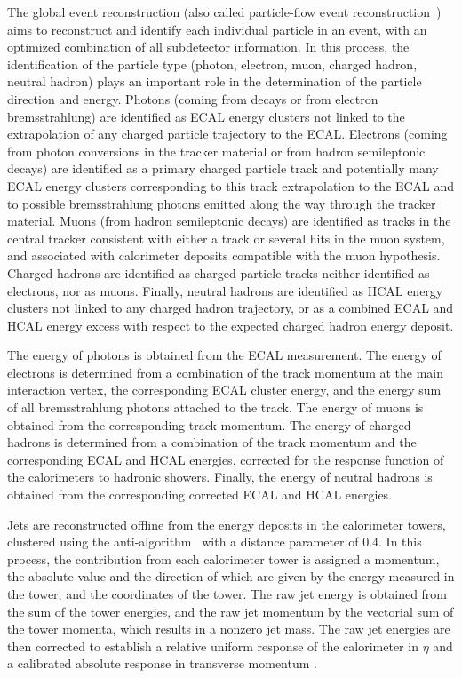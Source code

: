 The global event reconstruction (also called particle-flow event reconstruction~\cite{CMS:2017yfk}) aims to reconstruct and identify each individual particle in an event, with an optimized combination of all subdetector information. In this process, the identification of the particle type (photon, electron, muon, charged hadron, neutral hadron) plays an important role in the determination of the particle direction and energy. Photons (\eg coming from \PGpz decays or from electron bremsstrahlung) are identified as ECAL energy clusters not linked to the extrapolation of any charged particle trajectory to the ECAL. Electrons (\eg coming from photon conversions in the tracker material or from \PB hadron semileptonic decays) are identified as a primary charged particle track and potentially many ECAL energy clusters corresponding to this track extrapolation to the ECAL and to possible bremsstrahlung photons emitted along the way through the tracker material. Muons (\eg from \PB hadron semileptonic decays) are identified as tracks in the central tracker consistent with either a track or several hits in the muon system, and associated with calorimeter deposits compatible with the muon hypothesis. Charged hadrons are identified as charged particle tracks neither identified as electrons, nor as muons. Finally, neutral hadrons are identified as HCAL energy clusters not linked to any charged hadron trajectory, or as a combined ECAL and HCAL energy excess with respect to the expected charged hadron energy deposit.

The energy of photons is obtained from the ECAL measurement. The energy of electrons is determined from a combination of the track momentum at the main interaction vertex, the corresponding ECAL cluster energy, and the energy sum of all bremsstrahlung photons attached to the track. The energy of muons is obtained from the corresponding track momentum. The energy of charged hadrons is determined from a combination of the track momentum and the corresponding ECAL and HCAL energies, corrected for the response function of the calorimeters to hadronic showers. Finally, the energy of neutral hadrons is obtained from the corresponding corrected ECAL and HCAL energies.

Jets are reconstructed offline from the energy deposits in the calorimeter towers, clustered using the anti-\kt algorithm~\cite{Cacciari:2008gp, Cacciari:2011ma} with a distance parameter of 0.4. In this process, the contribution from each calorimeter tower is assigned a momentum, the absolute value and the direction of which are given by the energy measured in the tower, and the coordinates of the tower. The raw jet energy is obtained from the sum of the tower energies, and the raw jet momentum by the vectorial sum of the tower momenta, which results in a nonzero jet mass. The raw jet energies are then corrected to establish a relative uniform response of the calorimeter in $\eta$ and a calibrated absolute response in transverse momentum \pt.

